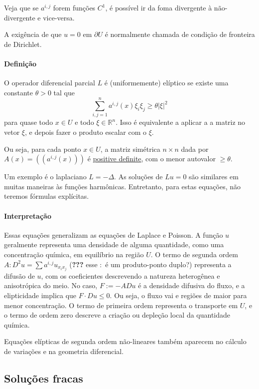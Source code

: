 \documentclass[a4paper, 11pt]{book}
\newcommand{\rn}{{\mathbb{R}^n}}
\newcommand{\pu}{\partial U}
\begin{document}
Veja que se $a^{i,j}$ forem funções $C^1$, é possível ir da foma divergente à não-divergente e vice-versa.

A exigência de que $u=0$ em $\pu$ é normalmente chamada de condição de fronteira de Dirichlet.

\paragraph{Definição} O operador diferencial parcial $L$ é (uniformemente) elíptico se existe uma constante $\theta>0$ tal que \[
	\sum_{i,j=1}^n a^{i,j}(x) \xi_i \xi_j \geq \theta|\xi|^2
\]
para quase todo $x \in U$ e todo $\xi \in \rn$. Isso é equivalente a aplicar a a matriz no vetor $\xi$, e depois fazer o produto escalar com o $\xi$.

Ou seja, para cada ponto $x \in U$, a matriz simétrica $n\times n$ dada por $A(x)= ((a^{i,j}(x)))$ é \href{https://en.wikipedia.org/wiki/Definite_matrix}{positive definite}, com o menor autovalor $\geq \theta$.

Um exemplo é o laplaciano $L=-\Delta$. As soluções de $Lu=0$ são similares em muitas maneiras às funções harmônicas. Entretanto, para estas equações, não teremos fórmulas explícitas.

\paragraph{Interpretação} Essas equações generalizam as equações de Laplace e Poisson. A função $u$ geralmente representa uma densidade de alguma quantidade, como uma concentração química, em equilíbrio na região $U$. O termo de segunda ordem $A: D^2u = \sum a^{i,j}u_{x_ix_j}$ (\textbf{???} esse $:$ é um produto-ponto duplo?) representa a difusão de $u$, com os coeficientes descrevendo a natureza heterogênea e anisotrópica do meio. No caso, $F := - ADu$ é a densidade difusiva do fluxo, e a elipticidade implica que $F \cdot Du \leq 0$. Ou seja, o fluxo vai e regiões de maior para menor concentração. O termo de primeira ordem representa o transporte em $U$, e o termo de ordem zero descreve a criação ou depleção local da quantidade química.

Equações elípticas de segunda ordem não-lineares também aparecem no cálculo de variações e na geometria diferencial.

\subsection{Soluções fracas}
\end{document}
